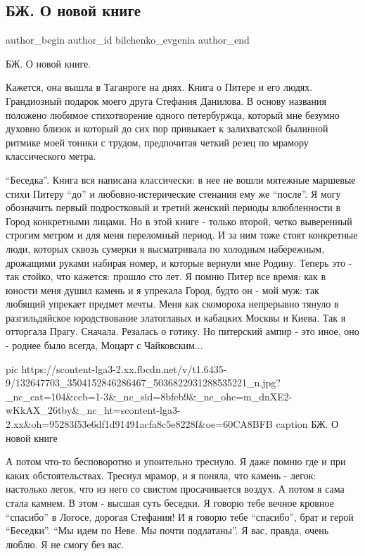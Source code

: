  
 
 
 
 
 
\subsection{БЖ. О новой книге}
\label{sec:25_12_2020.fb.bilchenko_evgenia.3.o_novoj_knige}
\ifcmt
 author_begin
   author_id bilchenko_evgenia
 author_end
\fi

БЖ. О новой книге.

Кажется, она вышла в Таганроге на днях. Книга о Питере и его людях. Грандиозный
подарок моего друга Стефания Данилова. В основу названия положено любимое
стихотворение одного петербуржца, который мне безумно духовно близок и который
до сих пор привыкает к залихватской былинной ритмике моей тоники с трудом,
предпочитая четкий резец по мрамору классического метра.

\enquote{Беседка}. Книга вся написана классически: в нее не вошли  мятежные маршевые
стихи Питеру \enquote{до} и любовно-истерические стенания ему же \enquote{после}. Я могу
обозначить первый подростковый и третий женский периоды влюбленности в Город
конкретными лицами. Но в этой книге - только второй, четко выверенный строгим
метром и для меня переломный период. И за ним тоже стоят конкретные люди,
которых сквозь сумерки я высматривала по холодным набережным, дрожащими руками
набирая номер, и которые вернули мне Родину. Теперь это - так стойко, что
кажется: прошло сто лет. Я помню Питер все время: как в юности меня душил
камень и я упрекала Город, будто он - мой муж: так любящий упрекает предмет
мечты. Меня как скомороха непрерывно тянуло в разгильдяйское юродствование
златоглавых и кабацких Москвы и Киева. Так я отторгала Прагу. Сначала. Резалась
о готику. Но питерский ампир - это иное, оно - роднее было всегда, Моцарт с
Чайковским...

\ifcmt
  pic https://scontent-lga3-2.xx.fbcdn.net/v/t1.6435-9/132647703_3504152846286467_5036822931288535221_n.jpg?_nc_cat=104&ccb=1-3&_nc_sid=8bfeb9&_nc_ohc=m_dnXE2-wKkAX_26tby&_nc_ht=scontent-lga3-2.xx&oh=95283f53e6df1d91491acfa8c5e8228f&oe=60CA8BFB
	caption БЖ. О новой книге
\fi

А потом что-то бесповоротно и упоительно треснуло. Я даже помню где и при каких
обстоятельствах. Треснул мрамор, и я поняла, что камень - легок: настолько
легок, что из него со свистом просачивается воздух. А потом я сама стала
камнем. В этом - высшая суть беседки. Я говорю тебе вечное кровное
\enquote{спасибо} в Логосе, дорогая Стефания! И я говорю тебе
\enquote{спасибо}, брат и герой \enquote{Беседки}.  \enquote{Мы идем по Неве.
Мы почти подлатаны}. Я вас, правда, очень люблю. Я не смогу без вас.

